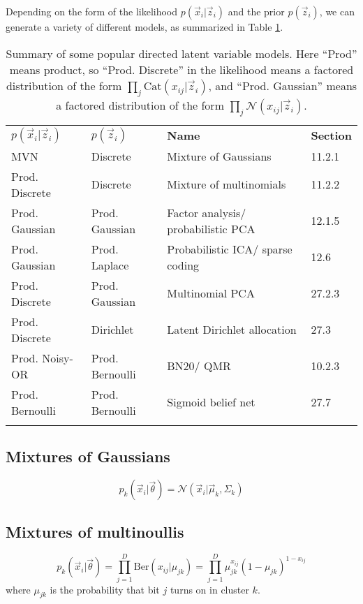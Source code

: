 Depending on the form of the likelihood $p(\vec{x}_i|\vec{z}_i)$ and the prior $p(\vec{z}_i)$, we can generate a variety of different models, as summarized in Table \ref{tab:popular-directed-latent-variable-models}.

\begin{table}
\label{tab:popular-directed-latent-variable-models}
\centering
\begin{tabular}{llll}
\hline\noalign{\smallskip}
$p(\vec{x}_i|\vec{z}_i)$ & $p(\vec{z}_i)$ & \textbf{Name} & \textbf{Section} \\
\noalign{\smallskip}\svhline\noalign{\smallskip}
MVN & Discrete & Mixture of Gaussians & 11.2.1 \\
Prod. Discrete & Discrete & Mixture of multinomials & 11.2.2 \\
Prod. Gaussian & Prod. Gaussian & Factor analysis/ probabilistic PCA & 12.1.5 \\
Prod. Gaussian & Prod. Laplace & Probabilistic ICA/ sparse coding & 12.6 \\
Prod. Discrete & Prod. Gaussian & Multinomial PCA & 27.2.3 \\
Prod. Discrete & Dirichlet & Latent Dirichlet allocation & 27.3 \\
Prod. Noisy-OR & Prod. Bernoulli & BN20/ QMR & 10.2.3 \\
Prod. Bernoulli & Prod. Bernoulli & Sigmoid belief net & 27.7 \\
\noalign{\smallskip}\hline
\end{tabular}
\caption{Summary of some popular directed latent variable models. Here “Prod” means product, so “Prod. Discrete” in the likelihood means a factored distribution of the form $\prod_j \mathrm{Cat}(x_{ij}|\vec{z}_i)$, and “Prod. Gaussian” means a factored distribution of the form $\prod_j \mathcal{N}(x_{ij}|\vec{z}_i)$.}
\end{table}


\subsection{Mixtures of Gaussians}
\begin{equation}
p_k(\vec{x}_i|\vec{\theta})=\mathcal{N}(\vec{x}_i|\vec{\mu}_k,\Sigma_k)
\end{equation}


\subsection{Mixtures of multinoullis}
\begin{equation}
p_k(\vec{x}_i|\vec{\theta})=\prod\limits_{j=1}^D \mathrm{Ber}(x_{ij}|\mu_{jk})=\prod\limits_{j=1}^D \mu_{jk}^{x_{ij}}(1-\mu_{jk})^{1-x_{ij}}
\end{equation}
where $\mu_{jk}$ is the probability that bit $j$ turns on in cluster $k$.

